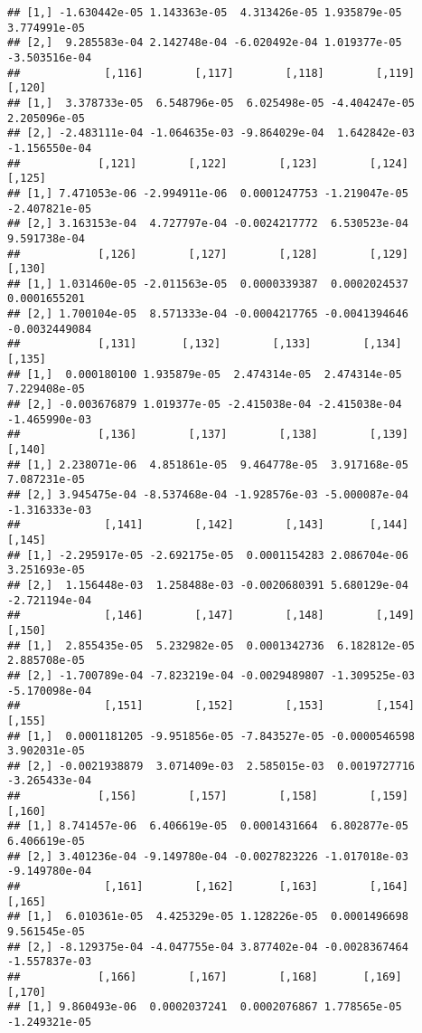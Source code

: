 \documentclass[
]{article}
\begin{document}
\begin{verbatim}
## [1,] -1.630442e-05 1.143363e-05  4.313426e-05 1.935879e-05  3.774991e-05
## [2,]  9.285583e-04 2.142748e-04 -6.020492e-04 1.019377e-05 -3.503516e-04
##             [,116]        [,117]        [,118]        [,119]        [,120]
## [1,]  3.378733e-05  6.548796e-05  6.025498e-05 -4.404247e-05  2.205096e-05
## [2,] -2.483111e-04 -1.064635e-03 -9.864029e-04  1.642842e-03 -1.156550e-04
##            [,121]        [,122]        [,123]        [,124]        [,125]
## [1,] 7.471053e-06 -2.994911e-06  0.0001247753 -1.219047e-05 -2.407821e-05
## [2,] 3.163153e-04  4.727797e-04 -0.0024217772  6.530523e-04  9.591738e-04
##            [,126]        [,127]        [,128]        [,129]        [,130]
## [1,] 1.031460e-05 -2.011563e-05  0.0000339387  0.0002024537  0.0001655201
## [2,] 1.700104e-05  8.571333e-04 -0.0004217765 -0.0041394646 -0.0032449084
##            [,131]       [,132]        [,133]        [,134]        [,135]
## [1,]  0.000180100 1.935879e-05  2.474314e-05  2.474314e-05  7.229408e-05
## [2,] -0.003676879 1.019377e-05 -2.415038e-04 -2.415038e-04 -1.465990e-03
##            [,136]        [,137]        [,138]        [,139]        [,140]
## [1,] 2.238071e-06  4.851861e-05  9.464778e-05  3.917168e-05  7.087231e-05
## [2,] 3.945475e-04 -8.537468e-04 -1.928576e-03 -5.000087e-04 -1.316333e-03
##             [,141]        [,142]        [,143]       [,144]        [,145]
## [1,] -2.295917e-05 -2.692175e-05  0.0001154283 2.086704e-06  3.251693e-05
## [2,]  1.156448e-03  1.258488e-03 -0.0020680391 5.680129e-04 -2.721194e-04
##             [,146]        [,147]        [,148]        [,149]        [,150]
## [1,]  2.855435e-05  5.232982e-05  0.0001342736  6.182812e-05  2.885708e-05
## [2,] -1.700789e-04 -7.823219e-04 -0.0029489807 -1.309525e-03 -5.170098e-04
##             [,151]        [,152]        [,153]        [,154]        [,155]
## [1,]  0.0001181205 -9.951856e-05 -7.843527e-05 -0.0000546598  3.902031e-05
## [2,] -0.0021938879  3.071409e-03  2.585015e-03  0.0019727716 -3.265433e-04
##            [,156]        [,157]        [,158]        [,159]        [,160]
## [1,] 8.741457e-06  6.406619e-05  0.0001431664  6.802877e-05  6.406619e-05
## [2,] 3.401236e-04 -9.149780e-04 -0.0027823226 -1.017018e-03 -9.149780e-04
##             [,161]        [,162]       [,163]        [,164]        [,165]
## [1,]  6.010361e-05  4.425329e-05 1.128226e-05  0.0001496698  9.561545e-05
## [2,] -8.129375e-04 -4.047755e-04 3.877402e-04 -0.0028367464 -1.557837e-03
##            [,166]        [,167]        [,168]       [,169]        [,170]
## [1,] 9.860493e-06  0.0002037241  0.0002076867 1.778565e-05 -1.249321e-05

\end{verbatim}
\end{document}
